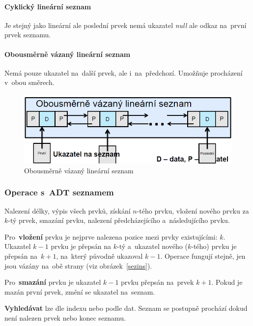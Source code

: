 \paragraph{Cyklický lineární seznam} Je stejný jako lineární ale poslední prvek nemá ukazatel \emph{null} ale odkaz na~první prvek seznamu.

\paragraph{Obousměrně vázaný lineární seznam} Nemá pouze ukazatel na~další prvek, ale i~na~předchozí. Umožňuje procházení v~obou směrech.

\begin{figure}[ht]
	\centering
	\includegraphics[scale=0.5]{images/obousez.PNG}
	\caption{Obousměrně vázaný lineární seznam}
	\label{obousez}
\end{figure}

\subsubsection{Operace s~ADT seznamem}

Nalezení délky, výpis všech prvků, získání \( n \)-tého prvku, vložení nového prvku za \( k \)-tý prvek, smazání prvku, nalezení předcházejícího a~následujícího prvku.

Pro~\textbf{vložení} prvku je nejprve nalezena pozice mezi prvky existujícími: \( k \). Ukazatel \( k-1 \) prvku je přepsán na \( k \)-tý a~ukazatel nového (\( k \)-tého) prvku je přepsán na~\( k+1 \), na~který původně ukazoval \( k-1 \). Operace fungují stejně, jen jsou vázány na~obě strany (viz obrázek~\ref{sezins}).

Pro~\textbf{smazání} prvku je ukazatel \( k-1 \) prvku přepsán na~prvek \( k+1 \). Pokud je mazán první prvek, změní se ukazatel na~seznam.

\textbf{Vyhledávat} lze dle indexu nebo podle dat. Seznam se postupně prochází dokud není nalezen prvek nebo konec seznamu.

